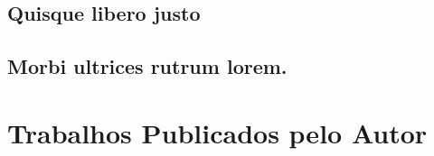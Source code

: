 \documentclass[
	12pt,				%
	openright,			%
	twoside,			%
	a4paper,			%
	tcc,			%
	]{ABNT-CCT-UENP}
\begin{document}

%
\begin{apendicesenv}

\partapendices

\chapter{Quisque libero justo}

\lipsum[50]

\end{apendicesenv}


%

\begin{anexosenv}

\partanexos

\chapter{Morbi ultrices rutrum lorem.}
\lipsum[30]

\end{anexosenv}


%
\chapter*{Trabalhos Publicados pelo Autor}
\end{document}
